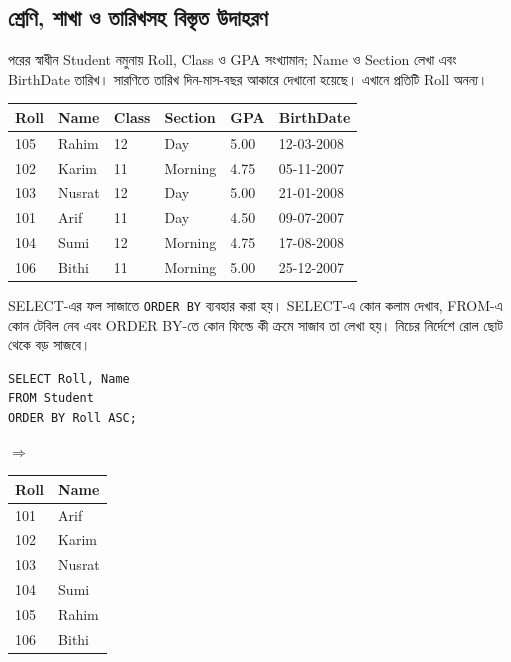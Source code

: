 \subsection{শ্রেণি, শাখা ও তারিখসহ বিস্তৃত উদাহরণ}
পরের স্বাধীন Student নমুনায় Roll, Class ও GPA সংখ্যামান; Name ও Section লেখা এবং BirthDate তারিখ। সারণিতে তারিখ দিন-মাস-বছর আকারে দেখানো হয়েছে। এখানে প্রতিটি Roll অনন্য।
\begin{flushleft}\begin{minipage}{\linewidth}\raggedright\small
\begin{tabular}{|l|l|l|l|l|l|}\hline
Roll & Name & Class & Section & GPA & BirthDate\\\hline
105 & Rahim & 12 & Day & 5.00 & 12-03-2008\\\hline
102 & Karim & 11 & Morning & 4.75 & 05-11-2007\\\hline
103 & Nusrat & 12 & Day & 5.00 & 21-01-2008\\\hline
101 & Arif & 11 & Day & 4.50 & 09-07-2007\\\hline
104 & Sumi & 12 & Morning & 4.75 & 17-08-2008\\\hline
106 & Bithi & 11 & Morning & 5.00 & 25-12-2007\\\hline
\end{tabular}
\end{minipage}\end{flushleft}
SELECT-এর ফল সাজাতে \texttt{ORDER BY} ব্যবহার করা হয়। SELECT-এ কোন কলাম দেখাব, FROM-এ কোন টেবিল নেব এবং ORDER BY-তে কোন ফিল্ডে কী ক্রমে সাজাব তা লেখা হয়। নিচের নির্দেশে রোল ছোট থেকে বড় সাজবে।
\par\smallskip\noindent\begin{minipage}{\linewidth}
\begin{minipage}[c]{.54\linewidth}
\begin{verbatim}
SELECT Roll, Name
FROM Student
ORDER BY Roll ASC;
\end{verbatim}
\end{minipage}\hfill\begin{minipage}[c]{.04\linewidth}$\Rightarrow$\end{minipage}\hfill
\begin{minipage}[c]{.39\linewidth}\raggedright\small
\begin{tabular}{|l|l|}\hline
Roll & Name\\\hline
101 & Arif\\\hline102 & Karim\\\hline103 & Nusrat\\\hline
104 & Sumi\\\hline105 & Rahim\\\hline106 & Bithi\\\hline
\end{tabular}
\end{minipage}
\end{minipage}\par\smallskip

